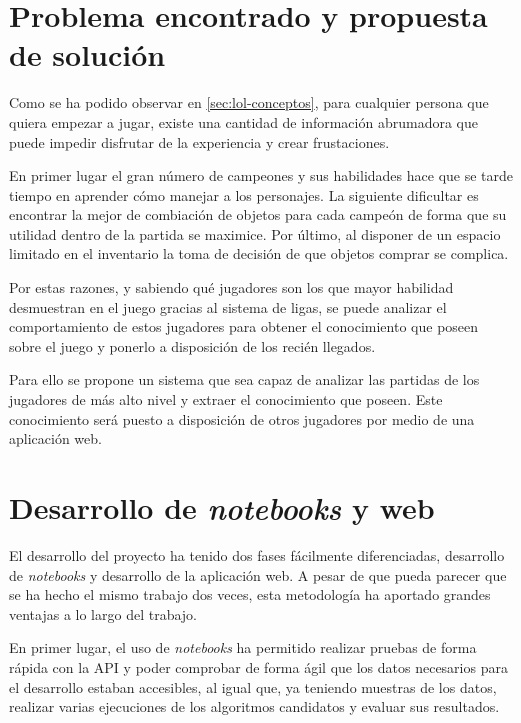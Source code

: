 


\section{Problema encontrado y propuesta de solución}
Como se ha podido observar en \ref{sec:lol-conceptos}, para cualquier persona que quiera empezar a jugar, existe una cantidad de información abrumadora que puede impedir disfrutar de la experiencia y crear frustaciones.

En primer lugar el gran número de campeones y sus habilidades hace que se tarde tiempo en aprender cómo manejar a los personajes. La siguiente dificultar es encontrar la mejor de combiación de objetos para cada campeón de forma que su utilidad dentro de la partida se maximice. Por último, al disponer de un espacio limitado en el inventario la toma de decisión de que objetos comprar se complica.

Por estas razones, y sabiendo qué jugadores son los que mayor habilidad desmuestran en el juego gracias al sistema de ligas, se puede analizar el comportamiento de estos jugadores para obtener el conocimiento que poseen sobre el juego y ponerlo a disposición de los recién llegados.

Para ello se propone un sistema que sea capaz de analizar las partidas de los jugadores de más alto nivel y extraer el conocimiento que poseen. Este conocimiento será puesto a disposición de otros jugadores por medio de una aplicación web.

\section{Desarrollo de \textit{notebooks} y web}
El desarrollo del proyecto ha tenido dos fases fácilmente diferenciadas, desarrollo de \textit{notebooks} y desarrollo de la aplicación web. A pesar de que pueda parecer que se ha hecho el mismo trabajo dos veces, esta metodología ha aportado grandes ventajas a lo largo del trabajo.

En primer lugar, el uso de \textit{notebooks} ha permitido realizar pruebas de forma rápida con la API y poder comprobar de forma ágil que los datos necesarios para el desarrollo estaban accesibles, al igual que, ya teniendo muestras de los datos, realizar varias ejecuciones de los algoritmos candidatos y evaluar sus resultados.

